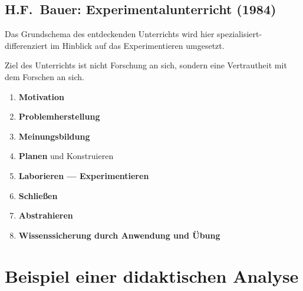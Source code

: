 \section{H.F.\ Bauer: Experimentalunterricht (1984)}
Das Grundschema des entdeckenden Unterrichts wird
hier spezialisiert-differenziert im Hinblick auf
das Experimentieren umgesetzt.

\mip Ziel des Unterrichts ist nicht Forschung an sich, sondern eine
Vertrautheit mit dem Forschen an sich.
	\begin{enumerate}
	\item {\bf Motivation}
	\item {\bf Problemherstellung}
	\item {\bf Meinungsbildung}
	\item {\bf Planen} und Konstruieren
	\item {\bf Laborieren --- Experimentieren}
	\item {\bf Schlie{\ss}en}
	\item {\bf Abstrahieren}
	\item {\bf Wissenssicherung durch Anwendung und \"{U}bung}
\end{enumerate}


\chapter{Beispiel einer didaktischen Analyse}\label{A_DidAna}